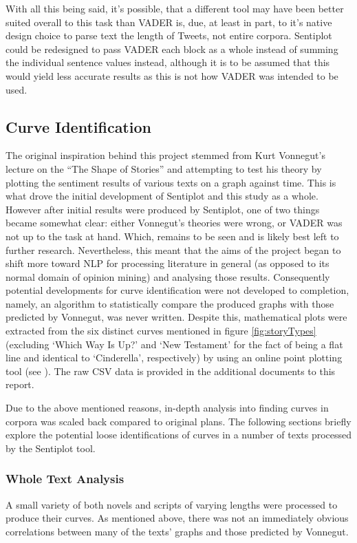 \documentclass{article}
\begin{document}
{        With all this being said, it's possible, that a different tool may have been better suited overall to this task than VADER is, due, at least in part, to it's native design choice to parse text the length of Tweets, not entire corpora. Sentiplot could be redesigned to pass VADER each block as a whole instead of summing the individual sentence values instead, although it is to be assumed that this would yield less accurate results as this is not how VADER was intended to be used.
    \subsection{Curve Identification}
    \label{subsec:curves}
        The original inspiration behind this project stemmed from Kurt Vonnegut's lecture on the ``The Shape of Stories'' and attempting to test his theory by plotting the sentiment results of various texts on a graph against time. This is what drove the initial development of Sentiplot and this study as a whole. However after initial results were produced by Sentiplot, one of two things became somewhat clear: either Vonnegut's theories were wrong, or VADER was not up to the task at hand. Which, remains to be seen and is likely best left to further research. Nevertheless, this meant that the aims of the project began to shift more toward NLP for processing literature in general (as opposed to its normal domain of opinion mining) and analysing those results. Consequently potential developments for curve identification were not developed to completion, namely, an algorithm to statistically compare the produced graphs with those predicted by Vonnegut, was never written. Despite this, mathematical plots were extracted from the six distinct curves mentioned in figure \ref{fig:storyTypes} (excluding `Which Way Is Up?' and `New Testament' for the fact of being a flat line and identical to `Cinderella', respectively) by using an online point plotting tool (see \cite{webPlotDigitizer}). The raw CSV data is provided in the additional documents to this report.

        Due to the above mentioned reasons, in-depth analysis into finding curves in corpora was scaled back compared to original plans. The following sections briefly explore the potential loose identifications of curves in a number of texts processed by the Sentiplot tool.
        \subsubsection{Whole Text Analysis}
            A small variety of both novels and scripts of varying lengths were processed to produce their curves. As mentioned above, there was not an immediately obvious correlations between many of the texts' graphs and those predicted by Vonnegut. 
            
}
\end{document}
